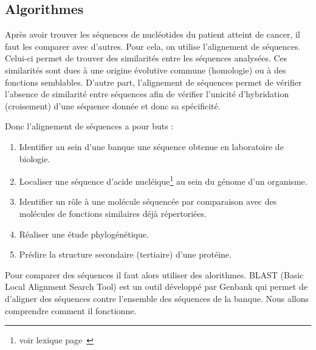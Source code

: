 \documentclass[12pt, openany]{report}
\begin{document}

\subsection{Algorithmes}

Après avoir trouver les séquences de nucléotides du patient atteint de cancer, il faut les comparer avec d’autres. Pour cela, on utilise l’alignement de séquences. Celui-ci permet de trouver des similarités entre les séquences analysées. Ces similarités sont dues à une origine évolutive commune (homologie) ou à des fonctions semblables.
D'autre part, l'alignement de séquences permet de vérifier l'absence de similarité entre séquences afin de vérifier l'unicité d'hybridation (croisement)  d'une séquence donnée et donc sa spécificité.

Donc l'alignement de séquences a pour buts :
\begin{enumerate}
\item	Identifier au sein d'une banque une séquence obtenue en laboratoire de biologie.											
 \item Localiser une séquence d'acide nucléique\footnote{voir lexique page~\pageref{lexique}} au sein du génome d'un organisme.              											
\item Identifier un rôle à une molécule séquencée par comparaison avec des molécules de fonctions similaires déjà répertoriées.							
\item Réaliser une étude phylogénétique.									
\item Prédire la structure secondaire (tertiaire) d'une protéine.
\end{enumerate}

Pour comparer des séquences il faut alors utiliser des alorithmes. BLAST (Basic Local Alignment Search Tool) est un outil développé par Genbank qui permet de d'aligner des séquences contre l'ensemble des séquences de la banque. Nous allons comprendre comment il fonctionne.
\end{document}
